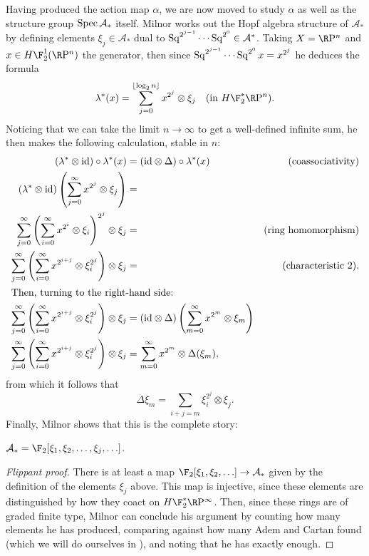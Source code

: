 Having produced the action map $\alpha$, we are now moved to study $\alpha$ as well as the structure group $\operatorname{Spec} \mathcal A_*$ itself.  Milnor works out the Hopf algebra structure of $\mathcal A_*$ by defining elements $\xi_j \in \mathcal A_*$ dual to $\operatorname{Sq}^{2^{j-1}} \cdots \operatorname{Sq}^{2^0} \in \mathcal A^*$.  Taking $X = \RP^n$ and $x \in H\F_2^1(\RP^n)$ the generator, then since $\operatorname{Sq}^{2^{j-1}} \cdots \operatorname{Sq}^{2^0} x = x^{2^j}$ he deduces the formula \[\lambda^*(x) = \sum_{j=0}^{\lfloor \log_2 n \rfloor} x^{2^j} \otimes \xi_j \text{\quad (in $H\F_2^* \RP^n$)}.\]  Noticing that we can take the limit $n \to \infty$ to get a well-defined infinite sum, he then makes the following calculation, stable in $n$:
\begin{align*}
(\lambda^* \otimes \mathrm{id}) \circ \lambda^*(x) & = (\mathrm{id} \otimes \Delta) \circ \lambda^*(x) & \text{(coassociativity)} \\
(\lambda^* \otimes \mathrm{id}) \left( \sum_{j=0}^\infty x^{2^j} \otimes \xi_j \right) & = \\
\sum_{j=0}^\infty \left( \sum_{i=0}^\infty x^{2^i} \otimes \xi_i \right)^{2^j} \otimes \xi_j & = & \text{(ring homomorphism)} \\
\sum_{j=0}^\infty \left( \sum_{i=0}^\infty x^{2^{i+j}} \otimes \xi_i^{2^j} \right) \otimes \xi_j & = & \text{(characteristic $2$)}. \\
\intertext{Then, turning to the right-hand side:}
\sum_{j=0}^\infty \left( \sum_{i=0}^\infty x^{2^{i+j}} \otimes \xi_i^{2^j} \right) \otimes \xi_j & = (\mathrm{id} \otimes \Delta) \left( \sum_{m=0}^\infty x^{2^m} \otimes \xi_m \right) \\
\sum_{j=0}^\infty \left( \sum_{i=0}^\infty x^{2^{i+j}} \otimes \xi_i^{2^j} \right) \otimes \xi_j & = \sum_{m=0}^\infty x^{2^m} \otimes \Delta(\xi_m),
\end{align*}
from which it follows that \[\Delta \xi_m = \sum_{i+j=m} \xi_i^{2^j} \otimes \xi_j.\]  Finally, Milnor shows that this is the complete story:
\begin{theorem}\label{StableSteenrodAlgebraQuote}
$\mathcal A_* = \F_2[\xi_1, \xi_2, \ldots, \xi_j, \ldots]$.
\end{theorem}
\begin{proof}[Flippant proof]
There is at least a map $\F_2[\xi_1, \xi_2, \ldots] \to \mathcal A_*$ given by the definition of the elements $\xi_j$ above.  This map is injective, since these elements are distinguished by how they coact on $H\F_2^* \RP^\infty$.  Then, since these rings are of graded finite type, Milnor can conclude his argument by counting how many elements he has produced, comparing against how many Adem and Cartan found (which we will do ourselves in ), and noting that he has exactly enough.
\end{proof}

